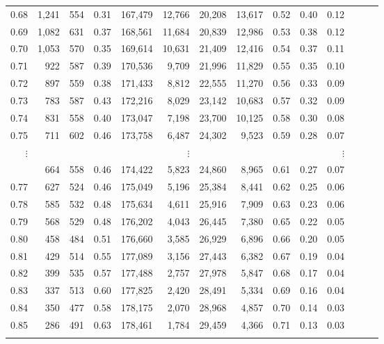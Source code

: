\begin{tabular}{rrrrrrrrrrrrrr}
0.68 &  1,241 &  554 &  0.31 &  167,479 &   12,766 &  20,208 &  13,617 &  0.52 &  0.40 &      0.12 \\
0.69 &  1,082 &  631 &  0.37 &  168,561 &   11,684 &  20,839 &  12,986 &  0.53 &  0.38 &      0.12 \\
0.70 &  1,053 &  570 &  0.35 &  169,614 &   10,631 &  21,409 &  12,416 &  0.54 &  0.37 &      0.11 \\
0.71 &    922 &  587 &  0.39 &  170,536 &    9,709 &  21,996 &  11,829 &  0.55 &  0.35 &      0.10 \\
0.72 &    897 &  559 &  0.38 &  171,433 &    8,812 &  22,555 &  11,270 &  0.56 &  0.33 &      0.09 \\
0.73 &    783 &  587 &  0.43 &  172,216 &    8,029 &  23,142 &  10,683 &  0.57 &  0.32 &      0.09 \\
0.74 &    831 &  558 &  0.40 &  173,047 &    7,198 &  23,700 &  10,125 &  0.58 &  0.30 &      0.08 \\
0.75 &    711 &  602 &  0.46 &  173,758 &    6,487 &  24,302 &   9,523 &  0.59 &  0.28 &      0.07 \\
$\vdots$ &&&&& $\vdots$ &&&&& $\vdots$ \\
\begin{comment}
0.76 &    664 &  558 &  0.46 &  174,422 &    5,823 &  24,860 &   8,965 &  0.61 &  0.27 &      0.07 \\
0.77 &    627 &  524 &  0.46 &  175,049 &    5,196 &  25,384 &   8,441 &  0.62 &  0.25 &      0.06 \\
0.78 &    585 &  532 &  0.48 &  175,634 &    4,611 &  25,916 &   7,909 &  0.63 &  0.23 &      0.06 \\
0.79 &    568 &  529 &  0.48 &  176,202 &    4,043 &  26,445 &   7,380 &  0.65 &  0.22 &      0.05 \\
0.80 &    458 &  484 &  0.51 &  176,660 &    3,585 &  26,929 &   6,896 &  0.66 &  0.20 &      0.05 \\
0.81 &    429 &  514 &  0.55 &  177,089 &    3,156 &  27,443 &   6,382 &  0.67 &  0.19 &      0.04 \\
0.82 &    399 &  535 &  0.57 &  177,488 &    2,757 &  27,978 &   5,847 &  0.68 &  0.17 &      0.04 \\
0.83 &    337 &  513 &  0.60 &  177,825 &    2,420 &  28,491 &   5,334 &  0.69 &  0.16 &      0.04 \\
0.84 &    350 &  477 &  0.58 &  178,175 &    2,070 &  28,968 &   4,857 &  0.70 &  0.14 &      0.03 \\
0.85 &    286 &  491 &  0.63 &  178,461 &    1,784 &  29,459 &   4,366 &  0.71 &  0.13 &      0.03 \\

\end{comment}
\end{tabular}
